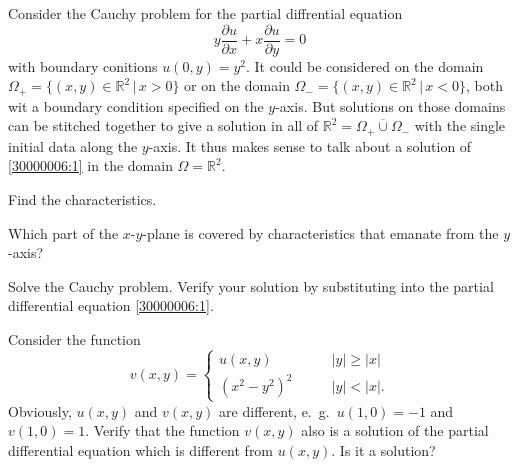 Consider the Cauchy problem for the partial diffrential equation
\begin{equation}
y\frac{\partial u}{\partial x}+x\frac{\partial u}{\partial y}=0
\label{30000006:1}
\end{equation}
with boundary conitions $u(0,y)=y^2$.
It could be considered on the domain
$\Omega_+=\{ (x,y)\in\mathbb R^2\,|\, x > 0\}$
or on the domain
$\Omega_-=\{(x,y)\in\mathbb R^2\,|\, x <0\}$,
both wit a boundary condition specified on the $y$-axis.
But solutions on those domains can be stitched together to give a solution
in all of $\mathbb R^2=\overline{\Omega_+\cup\Omega_-}$ with the single
initial data along the $y$-axis.
It thus makes sense to talk about a solution of 
\eqref{30000006:1} in the domain $\Omega=\mathbb R^2$.
\begin{teilaufgaben}
\item
Find the characteristics.
\item
Which part of the $x$-$y$-plane is covered by characteristics that emanate
from the $y$-axis?
\item
Solve the Cauchy problem.
Verify your solution by substituting into the partial differential equation
\eqref{30000006:1}.
\item
Consider the function
\[
v(x,y)=\begin{cases}
u(x,y)&\qquad |y|\ge |x|\\
(x^2-y^2)^2&\qquad |y|<|x|.
\end{cases}
\]
Obviously, $u(x,y)$ and $v(x,y)$ are different, e.~g.~$u(1,0)=-1$
and $v(1,0)=1$.
Verify that the function $v(x,y)$ also is a solution of the partial
differential equation which is different from $u(x,y)$.
Is it a solution?
\end{teilaufgaben}

